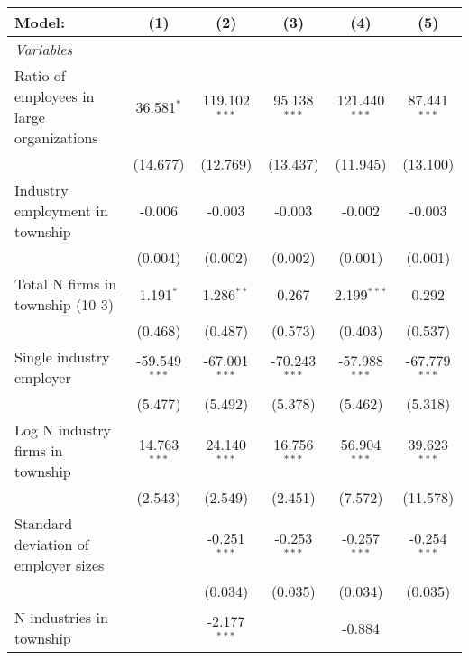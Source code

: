 \begingroup
\centering
\begin{tabular}{lccccc}
   \tabularnewline \midrule \midrule
   Model:                                    & (1)             & (2)             & (3)             & (4)             & (5)\\  
   \midrule
   \emph{Variables}\\
   Ratio of employees in large organizations & 36.581$^{*}$    & 119.102$^{***}$ & 95.138$^{***}$  & 121.440$^{***}$ & 87.441$^{***}$\\   
                                             & (14.677)        & (12.769)        & (13.437)        & (11.945)        & (13.100)\\   
   Industry employment in township           & -0.006          & -0.003          & -0.003          & -0.002          & -0.003\\   
                                             & (0.004)         & (0.002)         & (0.002)         & (0.001)         & (0.001)\\   
   Total N firms in township (10-3)          & 1.191$^{*}$     & 1.286$^{**}$    & 0.267           & 2.199$^{***}$   & 0.292\\   
                                             & (0.468)         & (0.487)         & (0.573)         & (0.403)         & (0.537)\\   
   Single industry employer                  & -59.549$^{***}$ & -67.001$^{***}$ & -70.243$^{***}$ & -57.988$^{***}$ & -67.779$^{***}$\\   
                                             & (5.477)         & (5.492)         & (5.378)         & (5.462)         & (5.318)\\   
   Log N industry firms in township          & 14.763$^{***}$  & 24.140$^{***}$  & 16.756$^{***}$  & 56.904$^{***}$  & 39.623$^{***}$\\   
                                             & (2.543)         & (2.549)         & (2.451)         & (7.572)         & (11.578)\\   
   Standard deviation of employer sizes      &                 & -0.251$^{***}$  & -0.253$^{***}$  & -0.257$^{***}$  & -0.254$^{***}$\\   
                                             &                 & (0.034)         & (0.035)         & (0.034)         & (0.035)\\   
   N industries in township                  &                 & -2.177$^{***}$  &                 & -0.884          &   \\   

\end{tabular}

